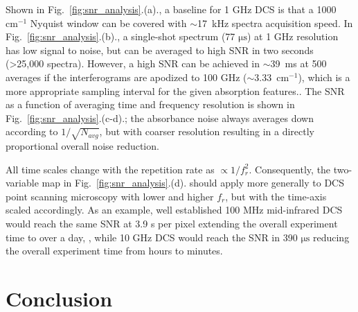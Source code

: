 \documentclass{optica-article}
\begin{document}
Shown in \mbox{Fig. \ref{fig:snr_analysis}.(a).}, a baseline for 1 GHz DCS is that a 1000 $\mathrm{cm^{-1}}$ Nyquist window can be covered with \mbox{$\sim$17 kHz} spectra acquisition speed. In \mbox{Fig. \ref{fig:snr_analysis}.(b).}, a single-shot spectrum (77 $\mathrm{\mu s}$) at 1 GHz resolution has low signal to noise, but can be averaged to high SNR in two seconds (>25,000 spectra). However, a high SNR can be achieved in \mbox{$\sim$39 ms} at 500 averages if the interferograms are apodized to 100 GHz (\mbox{$\sim$3.33 $\mathrm{cm^{-1}}$}), which is a more appropriate sampling interval for the given absorption features..  The SNR as a function of averaging time and frequency resolution is shown in \mbox{Fig. \ref{fig:snr_analysis}.(c-d).}; the absorbance noise always averages down according to $1/\sqrt{N_{avg}}$, but with coarser resolution resulting in a directly proportional overall noise reduction. 

All time scales change with the repetition rate as $\propto 1 / f_r^2$. Consequently, the two-variable map in  \mbox{Fig. \ref{fig:snr_analysis}.(d).} should apply more generally to DCS point scanning microscopy with lower and higher $f_r$, but with the time-axis scaled accordingly. As an example, well established 100 MHz mid-infrared DCS \cite{lindMidInfraredFrequencyComb2020,timmersMolecularFingerprintingBright2018} would reach the same SNR at 3.9 s per pixel extending the overall experiment time to over a day, \cite{timmersHyperspectralMicroscopyBroadband2019}, while 10 GHz DCS would reach the SNR in 390 $\mathrm{\mu s}$ reducing the overall experiment time from hours to minutes.

\section{Conclusion}





\end{document}
